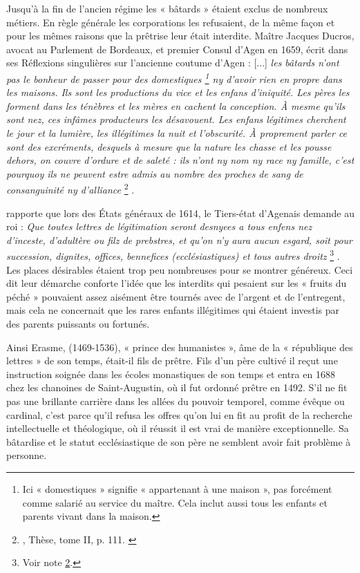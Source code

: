  Jusqu'à la fin de l'ancien régime les « bâtards » étaient exclus de nombreux métiers. En règle générale les corporations les refusaient, de la même façon et pour les mêmes raisons que la prêtrise leur était interdite. Maître Jacques Ducros, avocat au Parlement de Bordeaux, et premier Consul d'Agen en 1659, écrit dans ses Réflexions singulières sur l'ancienne coutume d'Agen : [...] \emph{les bâtards n'ont pas le bonheur de passer pour des domestiques%
\footnote{Ici « domestiques » signifie « appartenant à une maison », pas forcément comme salarié au service du maître. Cela inclut aussi tous les enfants et parents vivant dans la maison.} 
ny d'avoir rien en propre dans les maisons. Ils sont les productions du vice et les enfans d'iniquité. Les pères les forment dans les ténèbres et les mères en cachent la conception. À mesme qu'ils sont nez, ces infâmes producteurs les désavouent. Les enfans légitimes cherchent le jour et la lumière, les illégitimes la nuit et l'obscurité. À proprement parler ce sont des excréments, desquels à mesure que la nature les chasse et les pousse dehors, on couvre d'ordure et de saleté : ils n'ont ny nom ny race ny famille, c'est pourquoy ils ne peuvent estre admis au nombre des proches de sang de consanguinité ny d'alliance}%
\footnote{, Thèse, tome II, p. 111.%
\label{notecapul111}}%
.

  rapporte que lors des États généraux de 1614, le Tiers-état d'Agenais demande au roi : \emph{Que toutes lettres de légitimation seront desnyees a tous enfens nez d'inceste, d'adultère ou filz de prebstres, et qu'on n'y aura aucun esgard, soit pour succession, dignites, offices, bennefices (ecclésiastiques) et tous autres droitz}%
\footnote{%
Voir note \ref{notecapul111}.}%
. Les places désirables étaient trop peu nombreuses pour se montrer généreux. Ceci dit leur démarche conforte l'idée que les interdits qui pesaient sur les « fruits du péché » pouvaient assez aisément être tournés avec de l'argent et de l'entregent, mais cela ne concernait que les rares enfants illégitimes qui étaient investis par des parents puissants ou fortunés. 

 Ainsi Erasme, (1469-1536), « prince des humanistes », âme de la « république des lettres » de son temps, était-il fils de prêtre. Fils d'un père cultivé il reçut une instruction soignée dans les écoles monastiques de son temps et entra en 1688 chez les chanoines de Saint-Augustin, où il fut ordonné prêtre en 1492. S'il ne fit pas une brillante carrière dans les allées du pouvoir temporel, comme évêque ou cardinal, c'est parce qu'il refusa les offres qu'on lui en fit au profit de la recherche intellectuelle et théologique, où il réussit il est vrai de manière exceptionnelle. Sa bâtardise et le statut ecclésiastique de son père ne semblent avoir fait problème à personne. 

